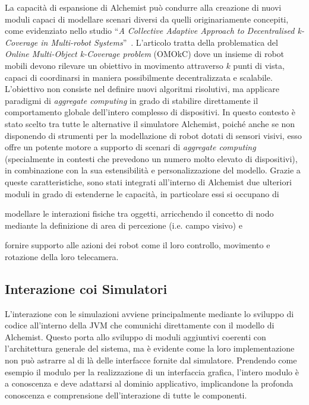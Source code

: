 La capacità di espansione di Alchemist può condurre alla creazione di nuovi moduli capaci di modellare scenari diversi da quelli originariamente
concepiti, come evidenziato nello studio ``\textit{A Collective Adaptive Approach to Decentralised k-Coverage in Multi-robot Systems}''~\cite{OMOkC}.
L'articolo tratta della problematica del \textit{Online Multi-Object k-Coverage problem} (OMOkC) dove un insieme di robot mobili
devono rilevare un obiettivo in movimento attraverso $k$ punti di vista, capaci di coordinarsi in maniera possibilmente decentralizzata
e scalabile. L'obiettivo non consiste nel definire nuovi algoritmi risolutivi, ma applicare paradigmi di \textit{aggregate computing}
in grado di stabilire direttamente il comportamento globale dell'intero complesso di dispositivi. In questo contesto è stato
scelto tra tutte le alternative il simulatore Alchemist, poiché anche se non disponendo di strumenti per la modellazione di
robot dotati di sensori visivi, esso offre un potente motore a supporto di scenari di \textit{aggregate computing} (specialmente
in contesti che prevedono un numero molto elevato di dispositivi), in combinazione con la sua estensibilità e personalizzazione del modello.
Grazie a queste caratteristiche, sono stati integrati all'interno di Alchemist due ulteriori moduli in grado di estenderne
le capacità, in particolare essi si occupano di 
\begin{enumerate*}[label=(\roman*)]
    \item modellare le interazioni fisiche tra oggetti, arricchendo il concetto di nodo mediante la definizione di area di percezione (i.e. campo visivo) e
    \item fornire supporto alle azioni dei robot come il loro controllo, movimento e rotazione della loro telecamera.
\end{enumerate*}

\subsection{Interazione coi Simulatori}\label{ssec:sim-interactions}
L'interazione con le simulazioni avviene principalmente mediante lo sviluppo di codice all'interno della \ac{JVM} che comunichi direttamente con il modello di Alchemist.
Questo porta allo sviluppo di moduli aggiuntivi coerenti con l'architettura generale del sistema, ma è evidente come la loro implementazione non può astrarre al di là delle interfacce fornite
dal simulatore. Prendendo come esempio il modulo per la realizzazione di un interfaccia grafica, l'intero modulo è a conoscenza e deve adattarsi al dominio applicativo, implicandone 
la profonda conoscenza e comprensione dell'interazione di tutte le componenti.

